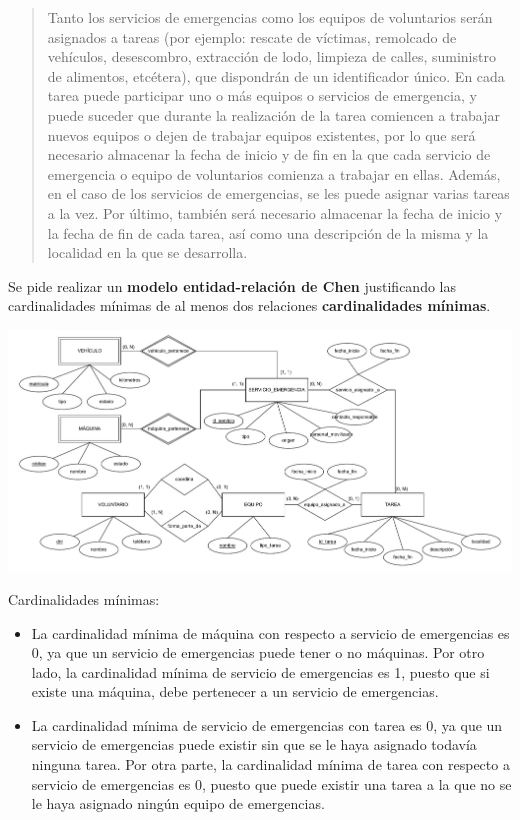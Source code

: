 \documentclass[
    12pt,
    a4paper,
    addpoints,
    answers,
    convocatoria=ord,
    titulacion=NoCD,
    curso=2024/2025,
]{db-exam}
\begin{document}
\begin{questions}
\begin{quotation}
Tanto los servicios de emergencias como los equipos de voluntarios serán asignados a tareas (por ejemplo: rescate de víctimas, remolcado de vehículos, desescombro, extracción de lodo, limpieza de calles, suministro de alimentos, etcétera), que dispondrán de un identificador único. En cada tarea puede participar uno o más equipos o servicios de emergencia, y puede suceder que durante la realización de la tarea comiencen a trabajar nuevos equipos o dejen de trabajar equipos existentes, por lo que será necesario almacenar la fecha de inicio y de fin en la que cada servicio de emergencia o equipo de voluntarios comienza a trabajar en ellas. Además, en el caso de los servicios de emergencias, se les puede asignar varias tareas a la vez. Por último, también será necesario almacenar la fecha de inicio y la fecha de fin de cada tarea, así como una descripción de la misma y la localidad en la que se desarrolla.
\end{quotation}

Se pide realizar un \textbf{modelo entidad-relación de Chen} justificando las cardinalidades mínimas de al menos dos relaciones \textbf{cardinalidades mínimas}.

\begin{solution}[50em]
\includegraphics[width=\textwidth]{figs/bbdd-2024-2025-ordinaria/MER.pdf}

Cardinalidades mínimas:
\begin{itemize}
    \item La cardinalidad mínima de máquina con respecto a servicio de emergencias es 0, ya que un servicio de emergencias puede tener o no máquinas. Por otro lado, la cardinalidad mínima de servicio de emergencias es 1, puesto que si existe una máquina, debe pertenecer a un servicio de emergencias.
    \item La cardinalidad mínima de servicio de emergencias con tarea es 0, ya que un servicio de emergencias puede existir sin que se le haya asignado todavía ninguna tarea. Por otra parte, la cardinalidad mínima de tarea con respecto a servicio de emergencias es 0, puesto que puede existir una tarea a la que no se le haya asignado ningún equipo de emergencias.
\end{itemize}
\end{solution}


\end{questions}
\end{document}
